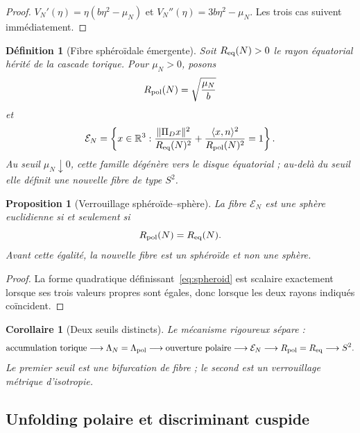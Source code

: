 \documentclass[11pt,a4paper]{article}
\newtheorem{proposition}[theorem]{Proposition}
\newtheorem{corollary}[theorem]{Corollaire}
\newtheorem{definition}[theorem]{Définition}
\newcommand{\R}{\mathbb R}
\begin{document}
\begin{proof}
$V_N'(\eta)=\eta(b\eta^2-\mu_N)$ et $V_N''(\eta)=3b\eta^2-\mu_N$. Les trois cas suivent immédiatement.
\end{proof}

\begin{definition}[Fibre sphéroïdale émergente]
Soit $R_{\rm eq}(N)>0$ le rayon équatorial hérité de la cascade torique. Pour $\mu_N>0$, posons
\[
 R_{\rm pol}(N)=\sqrt{\frac{\mu_N}{b}}
\]
et
\begin{equation}\label{eq:spheroid}
 \mathcal E_N=
 \left\{x\in\R^3:
 \frac{\|\Pi_Dx\|^2}{R_{\rm eq}(N)^2}
 +\frac{\langle x,n\rangle^2}{R_{\rm pol}(N)^2}=1
 \right\}.
\end{equation}
Au seuil $\mu_N\downarrow0$, cette famille dégénère vers le disque équatorial ; au-delà du seuil elle définit une nouvelle fibre de type $S^2$.
\end{definition}

\begin{proposition}[Verrouillage sphéroïde--sphère]\label{prop:spheroid-sphere}
La fibre $\mathcal E_N$ est une sphère euclidienne si et seulement si
\begin{equation}\label{eq:isotropy-lock}
 R_{\rm pol}(N)=R_{\rm eq}(N).
\end{equation}
Avant cette égalité, la nouvelle fibre est un sphéroïde et non une sphère.
\end{proposition}

\begin{proof}
La forme quadratique définissant~\eqref{eq:spheroid} est scalaire exactement lorsque ses trois valeurs propres sont égales, donc lorsque les deux rayons indiqués coïncident.
\end{proof}

\begin{corollary}[Deux seuils distincts]
Le mécanisme rigoureux sépare :
\[
 \text{accumulation torique}
 \longrightarrow \Lambda_N=\Lambda_{\rm pol}
 \longrightarrow \text{ouverture polaire}
 \longrightarrow \mathcal E_N
 \longrightarrow R_{\rm pol}=R_{\rm eq}
 \longrightarrow S^2.
\]
Le premier seuil est une bifurcation de fibre ; le second est un verrouillage métrique d'isotropie.
\end{corollary}

\subsection{Unfolding polaire et discriminant cuspide}
\end{document}
